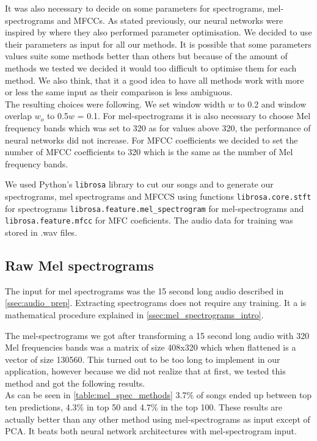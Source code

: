 It was also necessary to decide on some parameters for spectrograms, mel-spectrograms and MFCCs. As stated previously, our neural networks were inspired by \cite{inproceedings_RNNs} where they also performed parameter optimisation. We decided to use their parameters as input for all our methods. It is possible that some parameters values suite some methods better than others but because of the amount of methods we tested we decided it would too difficult to optimise them for each method. We also think, that it a good idea to have all methods work with more or less the same input as their comparison is less ambiguous. \\
The resulting choices were following. We set window width $w$ to 0.2 and window overlap $w_o$ to 0.5$w$ = 0.1. For mel-spectrograms it is also necessary to choose Mel frequency bands which was set to 320 as for values above 320, the performance of neural networks did not increase. For MFCC coefficients we decided to set the number of MFCC coefficients to 320 which is the same as the number of Mel frequency bands.

We used Python's \texttt{librosa} library \cite{brian_mcfee_2019_2564164} to cut our songs and to generate our spectrograms, mel spectrograms and MFCCS using functions \texttt{librosa.core.stft} for spectrograms \texttt{librosa.feature.mel\_spectrogram} for mel-spectrograms and \texttt{librosa.feature.mfcc} for MFC coeficients. The audio data for training was stored in .wav files.

\subsection{Raw Mel spectrograms}\label{ssec:raw_mels}
The input for mel spectrograms was the 15 second long audio described in \ref{ssec:audio_prep}. Extracting spectrograms does not require any training. It a is mathematical procedure explained in \ref{ssec:mel_spectrograms_intro}.

The mel-spectrograms we got after transforming a 15 second long audio with 320 Mel frequencies bands was a matrix of size 408x320 which when flattened is a vector of size 130560. This turned out to be too long to implement in our application, however because we did not realize that at first, we tested this method and got the following results. \\
As can be seen in \ref{table:mel_spec_methods} 3.7\% of songs ended up between top ten predictions, 4.3\% in top 50 and 4.7\% in the top 100. These results are actually better than any other method using mel-spectrograms as input except of PCA. It beats both neural network architectures with mel-spectrogram input. 

